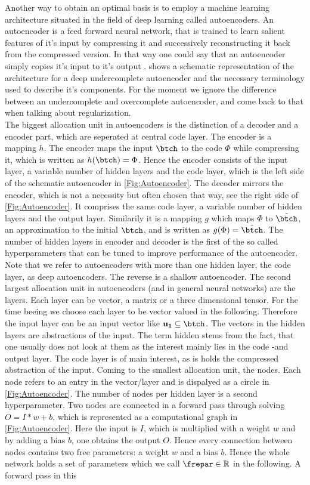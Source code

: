 Another way to obtain an optimal basis is to employ a machine learning architecture situated in the field of deep learning called autoencoders. An autoencoder is a feed forward neural network, that is trained to learn salient features of it's input by compressing it and successively reconstructing it back from the compressed version. In that way one could say that an autoencoder simply copies it's input to it's output \cite{Goodfellow}.  shows a schematic representation of the architecture for a deep undercomplete autoencoder and the necessary terminology used to describe it's components. For the moment we ignore the difference between an undercomplete and overcomplete autoencoder, and come back to that when talking about regularization. \\
The biggest allocation unit in autoencoders is the distinction of a decoder and a encoder part, which are seperated at central code layer. The encoder is a mapping \(h\). The encoder maps the input \(\btch\) to the code \(\Phi\) while compressing it, which is written as \(h(\btch)=\Phi\). Hence the encoder consists of the input layer, a variable number of hidden layers and the code layer, which is the left side of the schematic autoencoder in \cref{Fig:Autoencoder}. The decoder mirrors the encoder, which is not a necessity but often chosen that way, see the right side of \cref{Fig:Autoencoder}. It comprises the same code layer, a variable number of hidden layers and the output layer. Similarily it is a mapping \(g\) which maps \(\Phi\) to \(\tilde{\btch}\), an approximation to the initial \(\btch\), and is written as \(g(\Phi)=\tilde{\btch}\). The number of hidden layers in encoder and decoder is the first of the so called hyperparameters that can be tuned to improve performance of the autoencoder. Note that we refer to autoencoders with more than one hidden layer, the code layer, as deep autoencoders. The reverse is a shallow autoencoder. The second largest allocation unit in autoencoders (and in general neural networks) are the layers. Each layer can be vector, a matrix or a three dimensional tensor. For the time beeing we choose each layer to be vector valued in the following. Therefore the input layer can be an input vector like \(\mathbf{u_1}\subseteq \btch\). The vectors in the hidden layers are abstractions of the input. The term hidden stems from the fact, that one usually does not look at them as the interest mainly lies in the code -and output layer. The code layer is of main interest, as is holds the compressed abstraction of the input. Coming to the smallest allocation unit, the nodes. Each node refers to an entry in the vector/layer and is dispalyed as a circle in \cref{Fig:Autoencoder}. The number of nodes per hidden layer is a second hyperparameter. Two nodes are connected in a forward pass through solving \(O=I*w+b\), which is represented as a computational graph in \cref{Fig:Autoencoder}. Here the input is \(I\), which is multiplied with a weight \(w\) and by adding a bias \(b\), one obtains the output \(O\). Hence every connection between nodes contains two free parameters: a weight \(w\) and a bias \(b\). Hence the whole network holds a set of parameters which we call \(\frepar \in \mathbb{R}\) in the following. A forward pass in this 